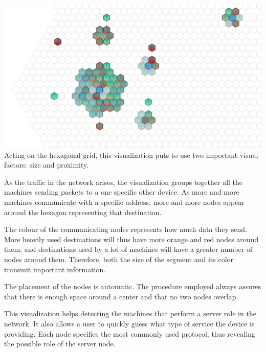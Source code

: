 \includegraphics[width=\linewidth]{materials/groups.jpg}
Acting on the hexagonal grid, this visualization puts to use two important visual factors:
size and proximity.

As the traffic in the network arises, the visualization groups together all the machines
sending packets to a one specific other device. As more and more machines communicate with a specific
address, more and more nodes appear around the hexagon representing that destination.

The colour of the communicating nodes represents how much data they send. More heavily used destinations 
will thus have more orange and red nodes around them, and destinations used by a lot of machines will have a greater number of nodes around them. Therefore, both the size of the segment and its color transmit important information.

The placement of the nodes is automatic. The procedure employed always assures that there is enough space around a center
and that no two nodes overlap.

This visualization helps detecting the machines that perform a server role in the network.
It also allows a user to quickly guess what type of service the device is providing. Each node specifies the
most commonly used protocol, thus revealing the possible role of the server node.